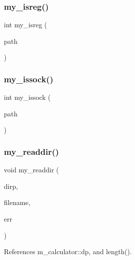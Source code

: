 \subsubsection{\texorpdfstring{my\+\_\+isreg()}{my\_isreg()}}
{\footnotesize\ttfamily int my\+\_\+isreg (\begin{DoxyParamCaption}\item[{const char $\ast$}]{path }\end{DoxyParamCaption})}

\mbox{\label{C-M__system_8c_a090bd041de7e5661c0cb3dea61517283}} 
\subsubsection{\texorpdfstring{my\+\_\+issock()}{my\_issock()}}
{\footnotesize\ttfamily int my\+\_\+issock (\begin{DoxyParamCaption}\item[{const char $\ast$}]{path }\end{DoxyParamCaption})}

\mbox{\label{C-M__system_8c_a56eb1f4025386fefa96810c8846a75ca}} 
\subsubsection{\texorpdfstring{my\+\_\+readdir()}{my\_readdir()}}
{\footnotesize\ttfamily void my\+\_\+readdir (\begin{DoxyParamCaption}\item[{D\+IR $\ast$}]{dirp,  }\item[{char $\ast$}]{filename,  }\item[{int $\ast$}]{err }\end{DoxyParamCaption})}



References m\+\_\+calculator\+::dp, and length().

